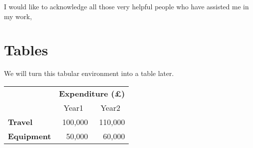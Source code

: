 \documentclass[12pt]{scrreprt}
\begin{document}
I would like to acknowledge all those
very helpful people who have assisted me in my work,

\appendix

\chapter{Tables}
We will turn this tabular environment into a table later.

\begin{tabular}{lrr}
                     & \multicolumn{2}{c}{\bfseries Expenditure (\pounds)} \\
                     & \multicolumn{1}{c}{Year1} & \multicolumn{1}{c}{Year2} \\
 \bfseries Travel    & 100,000 & 110,000 \\
 \bfseries Equipment & 50,000  & 60,000
\end{tabular}
\end{document}
